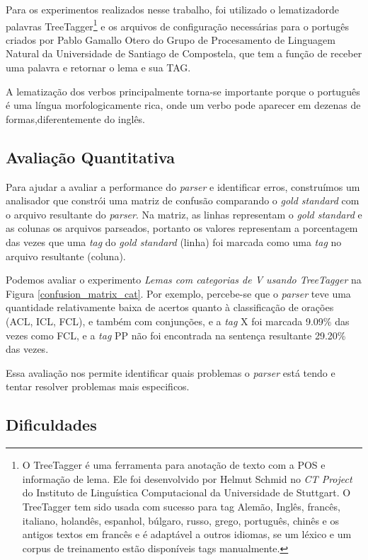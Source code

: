 Para os experimentos realizados nesse trabalho, foi utilizado o lematizadorde palavras TreeTagger\footnote{O TreeTagger é uma ferramenta para anotação de texto com a POS e informação de lema. Ele foi desenvolvido por Helmut Schmid no \emph{CT Project} do Instituto de Linguística Computacional da Universidade de Stuttgart. O TreeTagger tem sido usada com sucesso para tag Alemão, Inglês, francês, italiano, holandês, espanhol, búlgaro, russo, grego, português, chinês e os antigos textos em francês e é adaptável a outros idiomas, se um léxico e um corpus de treinamento estão disponíveis tags manualmente.} e os arquivos de configuração necessárias para o portugês criados por Pablo Gamallo Otero do Grupo de Procesamento de Linguagem Natural da Universidade de Santiago de Compostela, que tem a função de receber uma palavra e retornar o lema e sua TAG.

A lematização dos verbos principalmente torna-se importante porque o português é uma língua morfologicamente rica, onde um verbo pode aparecer em dezenas de formas,diferentemente do inglês.

\subsection{Avaliação Quantitativa}

Para ajudar a avaliar a performance do \emph{parser} e identificar erros, construímos um analisador que constrói uma matriz de confusão comparando o \emph{gold standard} com o arquivo resultante do \emph{parser}. Na matriz, as linhas representam o \emph{gold standard} e as colunas os arquivos parseados, portanto os valores representam a porcentagem das vezes que uma \emph{tag} do \emph{gold standard} (linha) foi marcada como uma \emph{tag} no arquivo resultante (coluna).

Podemos avaliar o experimento \emph{Lemas com categorias de V usando TreeTagger} na Figura \ref{confusion_matrix_cat}. Por exemplo, percebe-se que o \emph{parser} teve uma quantidade relativamente baixa de acertos quanto à classificação de orações (ACL, ICL, FCL), e também com conjunções, e a \emph{tag} X foi marcada 9.09\% das vezes como FCL, e a \emph{tag} PP não foi encontrada na sentença resultante 29.20\% das vezes.

Essa avaliação nos permite identificar quais problemas o \emph{parser} está tendo e tentar resolver problemas mais especificos.

\subsection{Dificuldades}
\label{sec:dificuldades}

